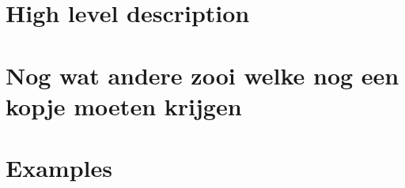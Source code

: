 \documentclass[10pt]{article}
\begin{document}
\section{High level description}



\section{Nog wat andere zooi welke nog een kopje moeten krijgen}

\section{Examples}
\end{document}

